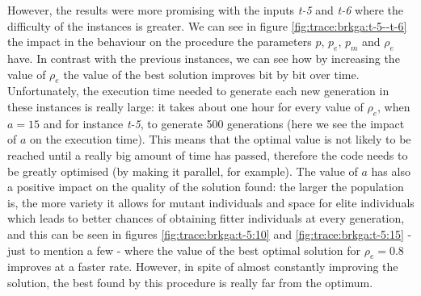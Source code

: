However, the results were more promising with the inputs \textit{t-5} and \textit{t-6} where
the difficulty of the instances is greater. We can see in figure \ref{fig:trace:brkga:t-5--t-6}
the impact in the behaviour on the procedure the parameters $p$, $p_e$, $p_m$ and $\rho_e$
have. In contrast with the previous instances, we can see how by increasing the value of
$\rho_e$ the value of the best solution improves bit by bit over time. Unfortunately, the
execution time needed to generate each new generation in these instances is really large: it
takes about one hour for every value of $\rho_e$, when $a = 15$ and for instance \textit{t-5},
to generate 500 generations (here we see the impact of $a$ on the execution time). This means
that the optimal value is not likely to be reached until a really big amount of time has 
passed, therefore the code needs to be greatly optimised (by making it parallel, for example).
The value of $a$ has also a positive impact on the quality of the solution found: the larger
the population is, the more variety it allows for mutant individuals and space for elite
individuals which leads to better chances of obtaining fitter individuals at every generation,
and this can be seen in figures \ref{fig:trace:brkga:t-5:10} and \ref{fig:trace:brkga:t-5:15}
- just to mention a few - where the value of the best optimal solution for $\rho_e = 0.8$
improves at a faster rate. However, in spite of almost constantly improving the solution, the
best found by this procedure is really far from the optimum.

